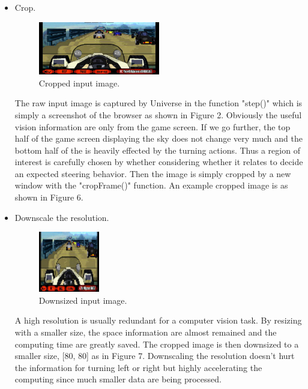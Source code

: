 \documentclass[a4paper]{article}
\begin{document}
\begin{itemize}

    \item Crop.
    
    	\begin{figure}[h]
   	 \centering
   	 \includegraphics[width=0.5\textwidth]{coaster-racer-vision-cropped}
    	\caption{Cropped input image.}
    	\end{figure}
    
    The raw input image is captured by Universe in the function "step()" which is simply a screenshot of the browser as shown in Figure 2. Obviously the useful vision information are only from the game screen. If we go further, the top half of the game screen displaying the sky does not change very much and the bottom half of the is heavily effected by the turning actions. Thus a region of interest is carefully chosen by whether considering whether it relates to decide an expected steering behavior.  Then the image is simply cropped by a new window with the "cropFrame()" function. An example cropped image is as shown in Figure 6.   
    
    \item Downscale the resolution.

    	\begin{figure}[h]
    	\centering
   	 \includegraphics[width=0.25\textwidth]{coaster-racer-vision-downsized}
   	 \caption{Downsized input image.}
    	\end{figure}
    
    A high resolution is usually redundant for a computer vision task. By resizing with a smaller size, the space information are almost remained and the computing time are greatly saved. The cropped image is then downsized to a smaller size, [80, 80] as in Figure 7. Downscaling the resolution doesn't hurt the information for turning left or right but highly accelerating the computing since much smaller data are being processed.
    

\end{itemize}
\end{document}
